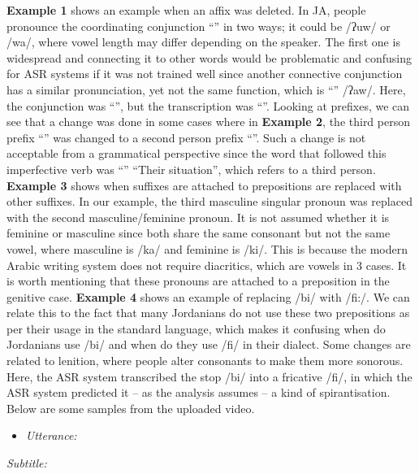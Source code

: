 \documentclass[english]{textolivre}
\newcommand{\ipa}[1]{{\ipafont #1}}
\begin{document}
\textbf{Example 1} shows an example when an affix was deleted. In JA,
people pronounce the coordinating conjunction ``'' in two ways; it
could be \ipa{/ʔuw/} or \ipa{/wa/}, where vowel length may differ depending on the
speaker. The first one is widespread and connecting it to other words
would be problematic and confusing for ASR systems if it was not trained
well since another connective conjunction has a similar pronunciation,
yet not the same function, which is ``'' \ipa{/ʔaw/}. Here, the
conjunction was ``'', but the transcription was ``''.
Looking at prefixes, we can see that a change was done in some cases
where in \textbf{Example 2}, the third person prefix ``'' was
changed to a second person prefix ``''. Such a change is not
acceptable from a grammatical perspective since the word that followed
this imperfective verb was ``'' ``Their situation'', which
refers to a third person. \textbf{Example 3} shows when suffixes are
attached to prepositions are replaced with other suffixes. In our
example, the third masculine singular pronoun was replaced with the
second masculine/feminine pronoun. It is not assumed whether it is
feminine or masculine since both share the same consonant but not the
same vowel, where masculine is \ipa{/ka/} and feminine is \ipa{/ki/}. This is
because the modern Arabic writing system does not require diacritics,
which are vowels in 3 cases. It is worth mentioning that these pronouns
are attached to a preposition in the genitive case. \textbf{Example 4}
shows an example of replacing \ipa{/bi/} with \ipa{/fi:/}. We can relate this to the
fact that many Jordanians do not use these two prepositions as per their
usage in the standard language, which makes it confusing when do
Jordanians use \ipa{/bi/} and when do they use \ipa{/fi/} in their dialect. Some
changes are related to lenition, where people alter consonants to make
them more sonorous. Here, the ASR system transcribed the stop \ipa{/bi/} into
a fricative \ipa{/fi/}, in which the ASR system predicted it -- as the
analysis assumes -- a kind of spirantisation. Below are some samples
from the uploaded video.

\begin{itemize}
\item \emph{Utterance: }
\end{itemize}

\emph{Subtitle: }
\end{document}
